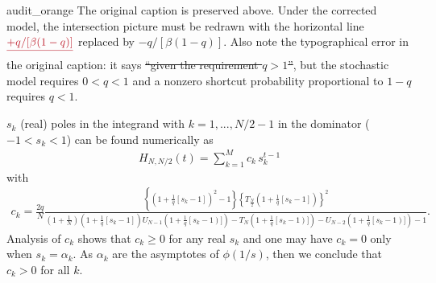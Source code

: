 \documentclass[10pt, hidelinks, superscriptaddress, amsmath, amssymb, aps, pre]{revtex4-2}
\newcommand{\audittextwrong}[1]{\textcolor{bright_red}{\sout{#1}}}
\begin{document}
\begin{auditbox}{audit_orange}
The original caption is preserved above.  Under the corrected model, the
intersection picture must be redrawn with the horizontal line
$\audittextwrong{+q/[\beta(1-q)]}$ replaced by $-q/[\beta(1-q)]$.
Also note the typographical error in the original caption:
it says \audittextwrong{``given the requirement $q>1$''}, but the stochastic model requires
$0<q<1$ and a nonzero shortcut probability proportional to $1-q$ requires
$q<1$.
\end{auditbox}
 $s_{k}$ (real) poles in the integrand with $k=1,...,N/2-1$ in the dominator ($-1<s_k<1$) can be found numerically as
\begin{align}
 H_{N,N/2}(t)=\sum_{k=1}^{M}c_k \,s_k^{t-1}
\label{eq:inv_z_t}
\end{align}
with
\begin{align}
c_k=\frac{2q}{N}\frac{\left\{\left(1+\frac{1}{q}\left[s_k-1\right]\right)^2-1\right\}\left\{T_{\frac{N}{2}}\left(1+\frac{1}{q}\left[s_k-1\right]\right)\right\}^2}{\left(1+\frac{1}{N}\right)\left(1+\frac{1}{q}\left[s_k-1\right]\right)U_{N-1}\left(1+\frac{1}{q}\left[s_k-1\right)]\right)-T_{N}\left(1+\frac{1}{q}\left[s_k-1\right)]\right)-U_{N-2}\left(1+\frac{1}{q}\left[s_k-1\right)]\right)-1}.
\label{eq:ck}
\end{align}
Analysis of $c_k$ shows that $c_k\geq 0$ for any real $s_k$ and one may have $c_k=0$ only when $s_k=\alpha_k$. As $\alpha_k$ are the asymptotes of $\phi(1/s)$, then we conclude that $c_k>0$ for all $k$.
\end{document}

